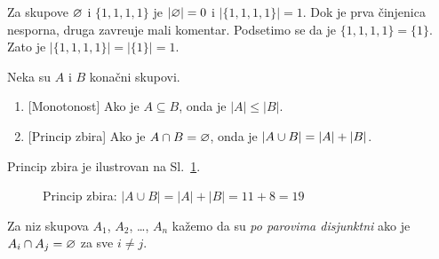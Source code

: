 \begin{EX}
  Za skupove $\varnothing$ i $\{1, 1, 1, 1\}$ je $|\varnothing| = 0$ i $|\{1, 1, 1, 1\}| = 1$.
  Dok je prva \v cinjenica nesporna, druga zavre\dj uje mali komentar. Podsetimo se da je
  $\{1, 1, 1, 1\} = \{1\}$. Zato je $|\{1, 1, 1, 1\}| = |\{1\}| = 1$.
\end{EX}

\begin{THM}
  Neka su $A$ i $B$ kona\v cni skupovi.
  \begin{enumerate}
  \item{} [Monotonost] Ako je $A \subseteq B$, onda je $|A| \le |B|$.
  \item{} [Princip zbira] Ako je $A \cap B = \varnothing$, onda je $|A \cup B| = |A| + |B|$.
  \end{enumerate}
\end{THM}

\noindent
Princip zbira je ilustrovan na Sl.~\ref{ft06.sl.pp-zbira}.

\begin{figure}[h]
  \centering
  
  \caption{Princip zbira: $|A \cup B| = |A| + |B| = 11 + 8 = 19$}
  \label{ft06.sl.pp-zbira}
\end{figure}

\begin{DEF}
  Za niz skupova $A_1$, $A_2$, \ldots, $A_n$ ka\v zemo da su \emph{po parovima disjunktni} ako je $A_i \cap A_j = \varnothing$
  za sve $i \ne j$.
\end{DEF}

